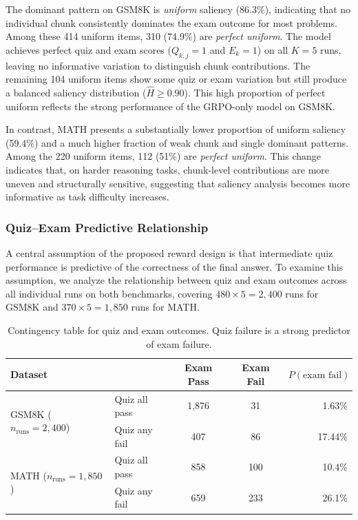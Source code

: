 \documentclass[12pt]{report}
\begin{document}
The dominant pattern on GSM8K is \emph{uniform} saliency (86.3\%), indicating that
no individual chunk consistently dominates the exam outcome for most
problems.  Among these 414 uniform items, 310 (74.9\%) are
\emph{perfect uniform}. The model achieves perfect quiz and exam scores
($Q_{k,j}=1$ and $E_k=1$) on all $K=5$ runs, leaving no informative
variation to distinguish chunk contributions.
The remaining 104 uniform items show some quiz or exam variation but
still produce a balanced saliency distribution ($\hat{H} \ge 0.90$).
This high proportion of perfect uniform reflects the strong
performance of the GRPO-only model on GSM8K.

In contrast, MATH presents a substantially lower proportion of uniform
saliency (59.4\%) and a much higher fraction of weak chunk and
single dominant patterns. Among the 220 uniform items, 112 (51\%) are 
\emph{perfect uniform}.
This change indicates that, on harder reasoning tasks, chunk-level
contributions are more uneven and structurally sensitive, suggesting
that saliency analysis becomes more informative as task difficulty
increases.

\subsubsection{Quiz--Exam Predictive Relationship}
\label{sec:quiz-exam-relationship}

A central assumption of the proposed reward design is that intermediate
quiz performance is predictive of the correctness of the final answer.
To examine this assumption, we analyze the relationship between quiz
and exam outcomes across all individual runs on both benchmarks,
covering $480 \times 5 = 2{,}400$ runs for GSM8K and
$370 \times 5 = 1{,}850$ runs for MATH.

\begin{table}[t]
\centering
\caption{Contingency table for quiz and exam outcomes. Quiz failure is a strong predictor of exam failure.}
\label{tab:quiz-exam-contingency-gsm8k-math}
\begin{tabular}{llccr}
\toprule
\textbf{Dataset} &  & \textbf{Exam Pass} & \textbf{Exam Fail} & \textbf{$P(\text{exam fail})$} \\
\midrule
\multirow{2}{*}{GSM8K ($n_{\text{runs}}=2{,}400$)}
& Quiz all pass & 1{,}876 &  31 & 1.63\% \\
& Quiz any fail &   407  &  86 & 17.44\% \\
\midrule
\multirow{2}{*}{MATH ($n_{\text{runs}}=1{,}850$)}
& Quiz all pass & 858 &  100 & 10.4\% \\
& Quiz any fail &   659  & 233 & 26.1\% \\
\bottomrule
\end{tabular}
\end{table}
\end{document}
